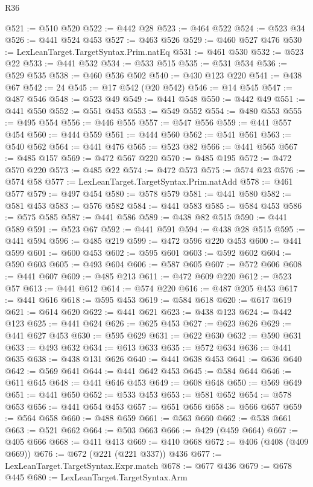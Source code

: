 \begin{lexlean}{R36}
\begin{coremodule}
{{{{{{{{{{{{{{{{{{{{{{{{{{{{{{{{{{{{{{{{{{{{{{{{{{{{{{{{{{{{{{{{{{{{{{{{{{{{{{{{{{@521 := @510 @520
@522 := @442 @28
@523 := @464 @522
@524 := @523 @34
@526 := @441 @524 @453
@527 := @463 @526
@529 := @460 @527 @476
@530 := LexLeanTarget.TargetSyntax.Prim.natEq
@531 := @461 @530
@532 := @523 @22
@533 := @441 @532
@534 := @533 @515
@535 := @531 @534
@536 := @529 @535
@538 := @460 @536 @502
@540 := @430 @123 @220
@541 := @438 @67
@542 := 24
@545 := @17 @542 (@20 @542)
@546 := @14 @545
@547 := @487 @546
@548 := @523 @49
@549 := @441 @548
@550 := @442 @49
@551 := @441 @550
@552 := @551 @453
@553 := @549 @552
@554 := @480 @553
@555 := @495 @554
@556 := @446 @555
@557 := @547 @556
@559 := @441 @557 @454
@560 := @444 @559
@561 := @444 @560
@562 := @541 @561
@563 := @540 @562
@564 := @441 @476
@565 := @523 @82
@566 := @441 @565
@567 := @485 @157
@569 := @472 @567 @220
@570 := @485 @195
@572 := @472 @570 @220
@573 := @485 @22
@574 := @472 @573
@575 := @574 @23
@576 := @574 @58
@577 := LexLeanTarget.TargetSyntax.Prim.natAdd
@578 := @461 @577
@579 := @497 @454
@580 := @578 @579
@581 := @441 @580
@582 := @581 @453
@583 := @576 @582
@584 := @441 @583
@585 := @584 @453
@586 := @575 @585
@587 := @441 @586
@589 := @438 @82 @515
@590 := @441 @589
@591 := @523 @67
@592 := @441 @591
@594 := @438 @28 @515
@595 := @441 @594
@596 := @485 @219
@599 := @472 @596 @220 @453
@600 := @441 @599
@601 := @600 @453
@602 := @595 @601
@603 := @592 @602
@604 := @590 @603
@605 := @493 @604
@606 := @587 @605
@607 := @572 @606
@608 := @441 @607
@609 := @485 @213
@611 := @472 @609 @220
@612 := @523 @57
@613 := @441 @612
@614 := @574 @220
@616 := @487 @205 @453
@617 := @441 @616
@618 := @595 @453
@619 := @584 @618
@620 := @617 @619
@621 := @614 @620
@622 := @441 @621
@623 := @438 @123
@624 := @442 @123
@625 := @441 @624
@626 := @625 @453
@627 := @623 @626
@629 := @441 @627 @453
@630 := @595 @629
@631 := @622 @630
@632 := @590 @631
@633 := @493 @632
@634 := @613 @633
@635 := @572 @634
@636 := @441 @635
@638 := @438 @131 @626
@640 := @441 @638 @453
@641 := @636 @640
@642 := @569 @641
@644 := @441 @642 @453
@645 := @584 @644
@646 := @611 @645
@648 := @441 @646 @453
@649 := @608 @648
@650 := @569 @649
@651 := @441 @650
@652 := @533 @453
@653 := @581 @652
@654 := @578 @653
@656 := @441 @654 @453
@657 := @651 @656
@658 := @566 @657
@659 := @564 @658
@660 := @488 @659
@661 := @563 @660
@662 := @538 @661
@663 := @521 @662
@664 := @503 @663
@666 := @429 (@459 @664)
@667 := @405 @666
@668 := @411 @413
@669 := @410 @668
@672 := @406 (@408 (@409 @669))
@676 := @672 (@221 (@221 @337)) @436
@677 := LexLeanTarget.TargetSyntax.Expr.match
@678 := @677 @436
@679 := @678 @445
@680 := LexLeanTarget.TargetSyntax.Arm
}}}}}}}}}}}}}}}}}}}}}}}}}}}}}}}}}}}}}}}}}}}}}}}}}}}}}}}}}}}}}}}}}}}}}}}}}}}}}}}}}}
\end{coremodule}
\end{lexlean}
